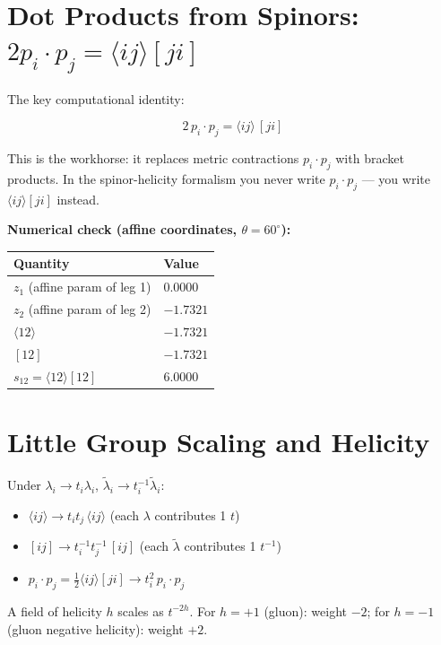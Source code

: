 \section{Dot Products from Spinors:
$2p_i\cdot p_j = \langle ij\rangle[ji]$}\label{sec:dot_products}

The key computational identity:

\begin{mdframed}[backgroundcolor=green!5]
\begin{equation}
\boxed{2\,p_i\cdot p_j = \langle ij\rangle\,[ji]}
\tag{50.17}
\end{equation}
\end{mdframed}

This is the workhorse: it replaces metric contractions $p_i\cdot p_j$ with
bracket products.  In the spinor-helicity formalism you never write
$p_i\cdot p_j$ --- you write $\langle ij\rangle[ji]$ instead.

\textbf{Numerical check (affine coordinates, $\theta=60^\circ$):}
\begin{center}
\begin{tabular}{|l|l|}
\hline
Quantity & Value \\
\hline
$z_1$ (affine param of leg 1) & $0.0000$ \\
$z_2$ (affine param of leg 2) & $-1.7321$ \\
$\langle 12\rangle$ & $-1.7321$ \\
$[12]$ & $-1.7321$ \\
$s_{12}=\langle12\rangle[12]$ & $6.0000$ \\
\hline
\end{tabular}
\end{center}

\section{Little Group Scaling and Helicity}\label{sec:helicity}

Under $\lambda_i\to t_i\lambda_i$, $\tilde\lambda_i\to t_i^{-1}\tilde\lambda_i$:
\begin{itemize}
\item $\langle ij\rangle\to t_i t_j\,\langle ij\rangle$ (each $\lambda$ contributes 1 $t$)
\item $[ij]\to t_i^{-1}t_j^{-1}\,[ij]$ (each $\tilde\lambda$ contributes 1 $t^{-1}$)
\item $p_i\cdot p_j = \tfrac12\langle ij\rangle[ji]\to t_i^2\,p_i\cdot p_j$
\end{itemize}
A field of helicity $h$ scales as $t^{-2h}$.  For $h=+1$ (gluon): weight $-2$;
for $h=-1$ (gluon negative helicity): weight $+2$.

